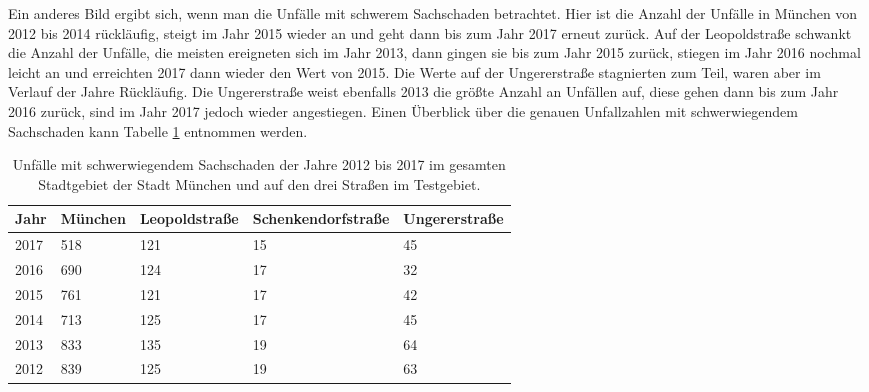 Ein anderes Bild ergibt sich, wenn man die Unfälle mit schwerem Sachschaden betrachtet. Hier ist die Anzahl der Unfälle in München von 2012 bis 2014 rückläufig, steigt im Jahr 2015 wieder an und geht dann bis zum Jahr 2017 erneut zurück. Auf der Leopoldstraße schwankt die Anzahl der Unfälle, die meisten ereigneten sich im Jahr 2013, dann gingen sie bis zum Jahr 2015 zurück, stiegen im Jahr 2016 nochmal leicht an und erreichten 2017 dann wieder den Wert von 2015. Die Werte auf der Ungererstraße stagnierten zum Teil, waren aber im Verlauf der Jahre Rückläufig. Die Ungererstraße weist ebenfalls 2013 die größte Anzahl an Unfällen auf, diese gehen dann bis zum Jahr 2016 zurück, sind im Jahr 2017 jedoch wieder angestiegen. Einen Überblick über die genauen Unfallzahlen mit schwerwiegendem Sachschaden kann Tabelle \ref{tab:Unfälle München schwerw. Sachschaden} entnommen werden. 

\begin{table}[htpb]
	\scriptsize
	\caption[Unfälle mit schwerwiegendem Sachschaden]{Unfälle mit schwerwiegendem Sachschaden der Jahre 2012 bis 2017 im gesamten Stadtgebiet der Stadt München und auf den drei Straßen im Testgebiet.}\label{tab:Unfälle München schwerw. Sachschaden}
	\centering
	\begin{tabular}{l l l l p{3cm}}
		\toprule
		Jahr & München & Leopoldstraße & Schenkendorfstraße & Ungererstraße \\
		\midrule
		2017 & 518\footnotemark[1] & 121 & 15 & 45\\
		2016 & 690\footnotemark[2] & 124 & 17 & 32\\
		2015 & 761\footnotemark[3] & 121 & 17 & 42\\
		2014 & 713\footnotemark[4] & 125 & 17 & 45\\
		2013 & 833\footnotemark[5] & 135 & 19 & 64\\
		2012 & 839\footnotemark[6] & 125 & 19 & 63\\
		\bottomrule
	\end{tabular}
\end{table}

